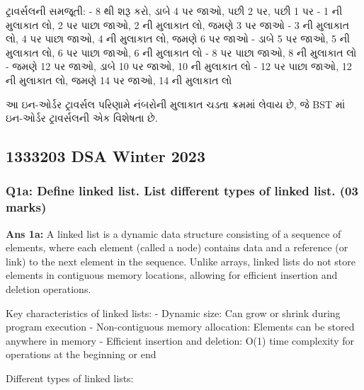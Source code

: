 ટ્રાવર્સલની સમજૂતી: - 8 થી શરૂ કરો, ડાબે 4 પર જાઓ, પછી 2 પર, પછી 1 પર - 1 ની
મુલાકાત લો, 2 પર પાછા જાઓ, 2 ની મુલાકાત લો, જમણે 3 પર જાઓ - 3 ની મુલાકાત લો,
4 પર પાછા જાઓ, 4 ની મુલાકાત લો, જમણે 6 પર જાઓ - ડાબે 5 પર જાઓ, 5 ની મુલાકાત
લો, 6 પર પાછા જાઓ, 6 ની મુલાકાત લો - 8 પર પાછા જાઓ, 8 ની મુલાકાત લો - જમણે
12 પર જાઓ, ડાબે 10 પર જાઓ, 10 ની મુલાકાત લો - 12 પર પાછા જાઓ, 12 ની મુલાકાત
લો, જમણે 14 પર જાઓ, 14 ની મુલાકાત લો

આ ઇન-ઓર્ડર ટ્રાવર્સલ પરિણામે નંબરોની મુલાકાત ચડતા ક્રમમાં લેવાય છે, જે BST માં
ઇન-ઓર્ડર ટ્રાવર્સલની એક વિશેષતા છે.

\hypertarget{dsa-winter-2023}{%
\subsection{1333203 DSA Winter 2023}\label{dsa-winter-2023}}

\hypertarget{q1a-define-linked-list.-list-different-types-of-linked-list.-03-marks}{%
\subsubsection{Q1a: Define linked list. List different types of linked
list. (03
marks)}\label{q1a-define-linked-list.-list-different-types-of-linked-list.-03-marks}}

\textbf{Ans 1a:} A linked list is a dynamic data structure consisting of
a sequence of elements, where each element (called a node) contains data
and a reference (or link) to the next element in the sequence. Unlike
arrays, linked lists do not store elements in contiguous memory
locations, allowing for efficient insertion and deletion operations.

Key characteristics of linked lists: - Dynamic size: Can grow or shrink
during program execution - Non-contiguous memory allocation: Elements
can be stored anywhere in memory - Efficient insertion and deletion:
O(1) time complexity for operations at the beginning or end

Different types of linked lists:

